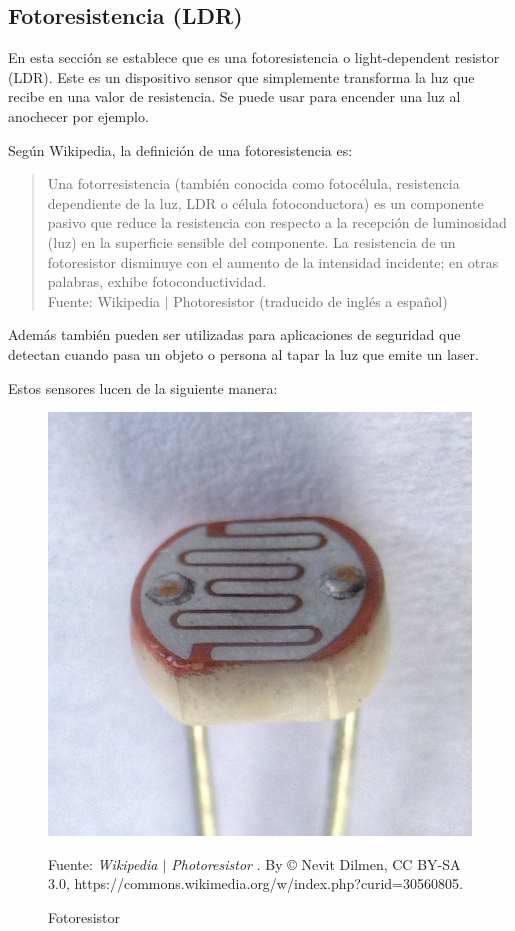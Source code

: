 \documentclass{article}
\begin{document}
\subsection{Fotoresistencia (LDR)}

En esta sección se establece que es una fotoresistencia o light-dependent resistor (LDR). Este es un dispositivo sensor que simplemente transforma la luz que recibe en una valor de resistencia. Se puede usar para encender una luz al anochecer por ejemplo.

\bigbreak

Según Wikipedia, la definición de una fotoresistencia es:

\begin{quote}
Una fotorresistencia (también conocida como fotocélula, resistencia dependiente de la luz, LDR o célula fotoconductora) es un componente pasivo que reduce la resistencia con respecto a la recepción de luminosidad (luz) en la superficie sensible del componente. La resistencia de un fotoresistor disminuye con el aumento de la intensidad incidente; en otras palabras, exhibe fotoconductividad.\\ \footnotesize
Fuente: Wikipedia $\mid$ Photoresistor (traducido de inglés a español) \cite{wikipedia-ldr-2022}
\end{quote}

Además también pueden ser utilizadas para aplicaciones de seguridad que detectan cuando pasa un objeto o persona al tapar la luz que emite un laser.

\bigbreak

Estos sensores lucen de la siguiente manera:

\begin{figure}[H]
\centering
\includegraphics[width=0.2\paperwidth]{images/ldr.jpg}
\caption{Fotoresistor}\footnotesize
Fuente: \textit{Wikipedia $\mid$ Photoresistor} \cite{wikipedia-ldr-2022}. By © Nevit Dilmen, CC BY-SA 3.0, https://commons.wikimedia.org/w/index.php?curid=30560805.
\end{figure}
\end{document}
